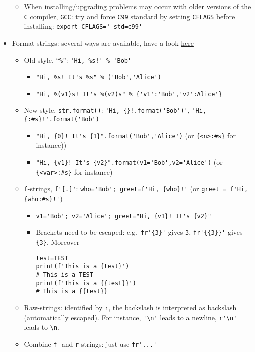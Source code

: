 \documentclass[a4paper,12pt,%
              final%
              ]{article}
\begin{document}
\begin{itemize}
\begin{itemize}
      \item When installing/upgrading problems may occur with older versions of the \texttt{C} compiler, \texttt{GCC}: try and force \texttt{C99} standard by setting \texttt{CFLAGS} before installing: \verb|export CFLAGS='-std=c99'|
    \end{itemize}
  \item Format strings: several ways are available, have a look \href{https://realpython.com/python-string-formatting/}{here}
    \begin{itemize}
      \item Old-style, ``\verb|%|'': \verb|'Hi, %s!' % 'Bob'|
        \begin{itemize}
          \item \verb|"Hi, %s! It's %s" % ('Bob','Alice')|
          \item \verb|"Hi, %(v1)s! It's %(v2)s" % {'v1':'Bob','v2':Alice'}|
        \end{itemize}
      \item New-style, \verb|str.format()|: \verb|'Hi, {}!.format('Bob')'|, \verb|'Hi, {:#s}!'.format('Bob')|
        \begin{itemize}
          \item \verb|"Hi, {0}! It's {1}".format('Bob','Alice')| (or \verb|{<n>:#s}| for instance))
          \item \verb|"Hi, {v1}! It's {v2}".format(v1='Bob',v2='Alice')| (or \verb|{<var>:#s}| for instance)
        \end{itemize}
      \item \texttt{f}-strings, \verb|f'[.]'|: \verb|who='Bob'; greet=f'Hi, {who}!'| (or \verb|greet = f'Hi, {who:#s}!'|)
        \begin{itemize}
          \item \verb|v1='Bob'; v2='Alice'; greet="Hi, {v1}! It's {v2}"|
          \item Brackets need to be escaped: e.g.~\verb|fr'{3}'| gives \verb|3|,  \verb|fr'{{3}}'| gives \verb|{3}|. Moreover
\begin{verbatim}
test=TEST
print(f'This is a {test}')
# This is a TEST
print(f'This is a {{test}}')
# This is a {{test}}
\end{verbatim}
        \end{itemize}
      \item Raw-strings: identified by \texttt{r}, the backslash is interpreted as backslash (automatically escaped). For instance, \verb|'\n'| leads to a newline, \verb|r'\n'| leads to \verb|\n|.
      \item Combine \texttt{f}- and \texttt{r}-strings: just use \verb|fr'...'|

\end{itemize}
\end{itemize}
\end{document}
